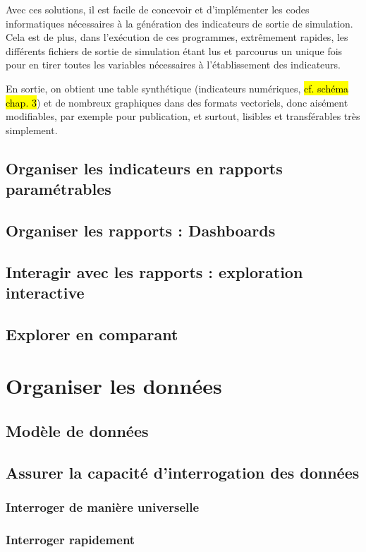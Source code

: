 	Avec ces solutions, il est facile de concevoir et d'implémenter les codes informatiques nécessaires à la génération des indicateurs de sortie de simulation.
	Cela est de plus, dans l'exécution de ces programmes, extrêmement rapides, les différents fichiers de sortie de simulation étant lus et parcourus un unique fois pour en tirer toutes les variables nécessaires à l'établissement des indicateurs.

	En sortie, on obtient une table synthétique (indicateurs numériques, \hl{cf. schéma chap. 3}) et de nombreux graphiques dans des formats vectoriels, donc aisément modifiables, par exemple pour publication, et surtout, lisibles et transférables très simplement.

	\subsection{Organiser les indicateurs en rapports paramétrables}
	\subsection{Organiser les rapports : Dashboards}
	\subsection{Interagir avec les rapports : exploration interactive}
	\subsection{Explorer en comparant}

\section{Organiser les données}
	\subsection{Modèle de données}
	\subsection{Assurer la capacité d'interrogation des données}
		\subsubsection{Interroger de manière universelle}
		\subsubsection{Interroger rapidement}
